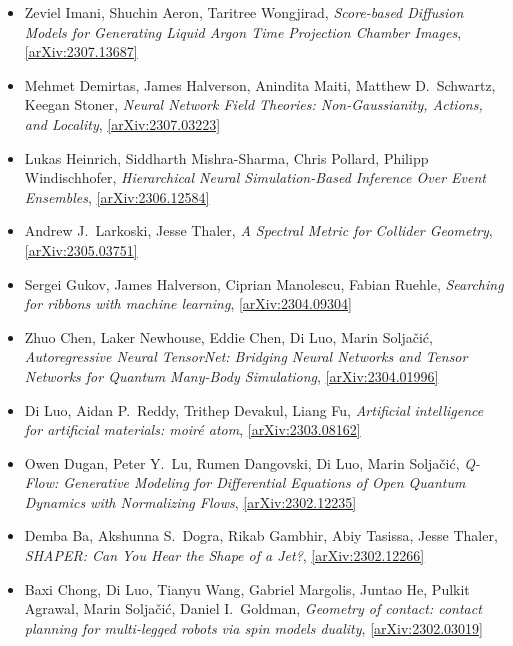 \begin{itemize}
\item Zeviel Imani, Shuchin Aeron, Taritree Wongjirad, \textit{Score-based Diffusion Models for Generating Liquid Argon Time Projection Chamber Images}, \href{https://arxiv.org/abs/2307.13687}{[arXiv:2307.13687]} 
\item Mehmet Demirtas, James Halverson, Anindita Maiti, Matthew D.\  Schwartz, Keegan Stoner, \textit{Neural Network Field Theories: Non-Gaussianity, Actions, and Locality}, \href{https://arxiv.org/abs/2307.03223}{[arXiv:2307.03223]} 
\item Lukas Heinrich, Siddharth Mishra-Sharma, Chris Pollard, Philipp Windischhofer, \textit{Hierarchical Neural Simulation-Based Inference Over Event Ensembles}, \href{https://arxiv.org/abs/2306.12584}{[arXiv:2306.12584]} 
\item Andrew J.\  Larkoski, Jesse Thaler, \textit{A Spectral Metric for Collider Geometry}, \href{https://arxiv.org/abs/2305.03751}{[arXiv:2305.03751]} 
\item Sergei Gukov, James Halverson, Ciprian Manolescu, Fabian Ruehle, \textit{Searching for ribbons with machine learning}, \href{https://arxiv.org/abs/2304.09304}{[arXiv:2304.09304]} 
\item Zhuo Chen, Laker Newhouse, Eddie Chen, Di Luo, Marin Soljačić, \textit{Autoregressive Neural TensorNet: Bridging Neural Networks and Tensor Networks for Quantum Many-Body Simulationg}, \href{https://arxiv.org/abs/2304.01996}{[arXiv:2304.01996]} 
\item Di Luo, Aidan P.\  Reddy, Trithep Devakul, Liang Fu, \textit{Artificial intelligence for artificial materials: moiré atom}, \href{https://arxiv.org/abs/2303.08162}{[arXiv:2303.08162]} 
\item Owen Dugan, Peter Y.\  Lu, Rumen Dangovski, Di Luo, Marin Soljačić, \textit{Q-Flow: Generative Modeling for Differential Equations of Open Quantum Dynamics with Normalizing Flows}, \href{https://arxiv.org/abs/2302.12235}{[arXiv:2302.12235]} 
\item Demba Ba, Akshunna S.\  Dogra, Rikab Gambhir, Abiy Tasissa, Jesse Thaler, \textit{SHAPER: Can You Hear the Shape of a Jet?}, \href{https://arxiv.org/abs/2302.12266}{[arXiv:2302.12266]} 
\item Baxi Chong, Di Luo, Tianyu Wang, Gabriel Margolis, Juntao He, Pulkit Agrawal, Marin Soljačić, Daniel I.\  Goldman, \textit{Geometry of contact: contact planning for multi-legged robots via spin models duality}, \href{https://arxiv.org/abs/2302.03019}{[arXiv:2302.03019]} 

\end{itemize}
